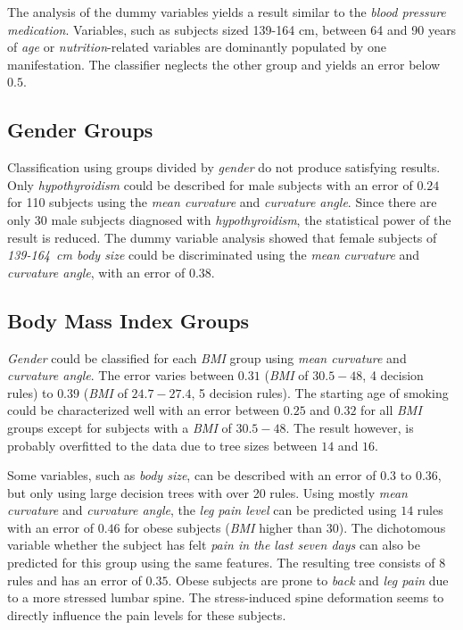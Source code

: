 \documentclass[a4paper,twoside]{style/article}
\begin{document}
The analysis of the dummy variables yields a result similar to the \emph{blood pressure medication}.
Variables, such as subjects sized 139-164 cm, between 64 and 90 years of \emph{age} or \emph{nutrition}-related variables are dominantly populated by one manifestation.
The classifier neglects the other group and yields an error below $0.5$.
\subsection{Gender Groups}
Classification using groups divided by \emph{gender} do not produce satisfying results.
Only \emph{hypothyroidism} could be described for male subjects with an error of $0.24$ for 110 subjects using the \emph{mean curvature} and \emph{curvature angle}.
Since there are only 30 male subjects diagnosed with \emph{hypothyroidism}, the statistical power of the result is reduced.
The dummy variable analysis showed that female subjects of \emph{139-164~cm body size} could be discriminated using the \emph{mean curvature} and \emph{curvature angle}, with an error of $0.38$.
\subsection{Body Mass Index Groups}
\emph{Gender} could be classified for each \emph{BMI} group using \emph{mean curvature} and \emph{curvature angle}.
The error varies between $0.31$ (\emph{BMI} of \emph{$30.5-48$}, 4 decision rules) to $0.39$ (\emph{BMI} of \emph{$24.7-27.4$}, 5 decision rules).
The starting age of smoking could be characterized well with an error between $0.25$ and $0.32$ for all \emph{BMI} groups except for subjects with a \emph{BMI} of \emph{$30.5-48$}.
The result however, is probably overfitted to the data due to tree sizes between $14$ and $16$.

Some variables, such as \emph{body size}, can be described with an error of $0.3$ to $0.36$, but only using large decision trees with over 20 rules.
Using mostly \emph{mean curvature} and \emph{curvature angle}, the \emph{leg pain level} can be predicted using $14$ rules with an error of $0.46$ for obese subjects (\emph{BMI} higher than $30$).
The dichotomous variable whether the subject has felt \emph{pain in the last seven days} can also be predicted for this group using the same features.
The resulting tree consists of $8$ rules and has an error of $0.35$.
Obese subjects are prone to \emph{back} and \emph{leg pain} due to a more stressed lumbar spine.
The stress-induced spine deformation seems to directly influence the pain levels for these subjects.
\end{document}
